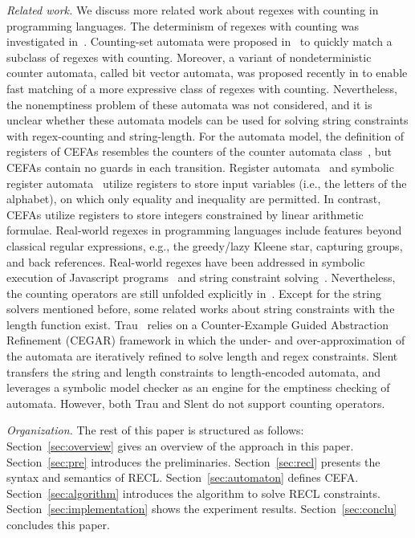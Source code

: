 \medskip
\noindent
\emph{Related work.} 
We discuss more related work about regexes with counting in programming languages.  
The determinism of regexes with counting was investigated in~\cite{GGM12,CL15}. Counting-set automata were proposed in~\cite{redos_lenka,HS+23} to quickly match a subclass of regexes with counting. Moreover, a variant of nondeterministic counter automata, called bit vector automata, was proposed recently in \cite{GKM23} to enable fast matching of a more expressive class of regexes with counting.   Nevertheless, the nonemptiness problem of these automata was not considered, and it is unclear whether these automata models can be used for solving string constraints with regex-counting and string-length. For the automata model, the definition of registers of CEFAs resembles the counters of the counter automata class~\cite{GGM12,redos_lenka,HS+23,GKM23}, but CEFAs contain no guards in each transition. Register automata~\cite{ra} and symbolic register automata~\cite{sra} utilize registers to store input variables (i.e., the letters of the alphabet), on which only equality and inequality are permitted. In contrast, CEFAs utilize registers to store integers constrained by linear arithmetic formulae.
Real-world regexes in programming languages include features beyond classical regular expressions, e.g., the greedy/lazy Kleene star, capturing groups, and back references. Real-world regexes have been addressed in symbolic execution of Javascript programs~\cite{LMK19} and string constraint solving~\cite{CF+22}. Nevertheless, the counting operators are still unfolded explicitly in~\cite{CF+22}. Except for the string solvers mentioned before, some related works about string constraints with the length function exist. Trau~\cite{z3trau} relies on a Counter-Example Guided Abstraction Refinement (CEGAR) framework in which the under- and over-approximation of the automata are iteratively refined to solve length and regex constraints. Slent~\cite{WC+18} transfers the string and length constraints to length-encoded automata, and leverages a symbolic model checker as an engine for the emptiness checking of automata. However, both Trau and Slent do not support counting operators.

\smallskip
\noindent
\emph{Organization.} 
The rest of this paper is structured as follows: Section~\ref{sec:overview} gives an overview of the approach in this paper. Section~\ref{sec:pre} introduces the preliminaries. 
Section~\ref{sec:recl} presents the syntax and semantics of RECL. 
Section~\ref{sec:automaton} defines CEFA. Section~\ref{sec:algorithm} introduces the algorithm to solve RECL constraints. Section~\ref{sec:implementation} shows the experiment results. Section~\ref{sec:conclu} concludes this paper.
